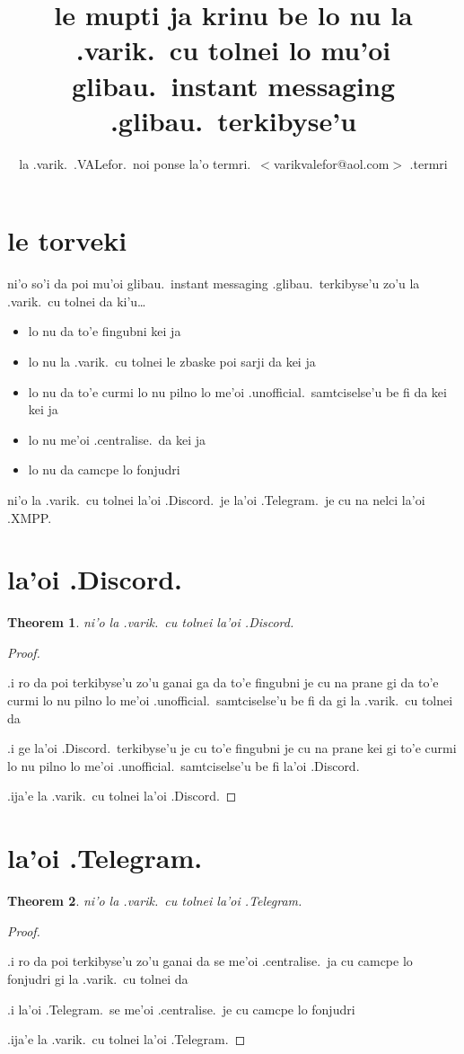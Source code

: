 \documentclass{article}
\title{le mupti ja krinu be lo nu la .varik.\ cu tolnei lo mu'oi glibau.\ instant messaging .glibau.\ terkibyse'u}
\author{la .varik.\ .VALefor.\ noi ponse la'o termri.\ $<$varikvalefor@aol.com$>$ .termri}
\newtheorem{thm}{Theorem}
\begin{document}
\maketitle

\section{le torveki}
ni'o so'i da poi mu'oi glibau.\ instant messaging .glibau.\ terkibyse'u zo'u la .varik.\ cu tolnei da ki'u\ldots
\begin{itemize}
	\item lo nu da to'e fingubni kei ja
	\item lo nu la .varik.\ cu tolnei le zbaske poi sarji da kei ja
	\item lo nu da to'e curmi lo nu pilno lo me'oi .unofficial.\ samtciselse'u be fi da kei kei ja
	\item lo nu me'oi .centralise.\ da kei ja
	\item lo nu da camcpe lo fonjudri
\end{itemize}

ni'o la .varik.\ cu tolnei la'oi .Discord.\ je la'oi .Telegram.\ je cu na nelci la'oi .XMPP.
\section{la'oi .Discord.}
\begin{thm}
	ni'o la .varik.\ cu tolnei la'oi .Discord.
\end{thm}
\begin{proof}
	${}$

	.i ro da poi terkibyse'u zo'u ganai ga da to'e fingubni je cu na prane gi da to'e curmi lo nu pilno lo me'oi .unofficial.\ samtciselse'u be fi da gi la .varik.\ cu tolnei da

	.i ge la'oi .Discord.\ terkibyse'u je cu to'e fingubni je cu na prane kei gi to'e curmi lo nu pilno lo me'oi .unofficial.\ samtciselse'u be fi la'oi .Discord.

	.ija'e la .varik.\ cu tolnei la'oi .Discord.
\end{proof}

\section{la'oi .Telegram.}
\begin{thm}
	ni'o la .varik.\ cu tolnei la'oi .Telegram.
\end{thm}
\begin{proof}
	${}$

	.i ro da poi terkibyse'u zo'u ganai da se me'oi .centralise.\ ja cu camcpe lo fonjudri gi la .varik.\ cu tolnei da

	.i la'oi .Telegram.\ se me'oi .centralise.\ je cu camcpe lo fonjudri

	.ija'e la .varik.\ cu tolnei la'oi .Telegram.
\end{proof}
\end{document}
